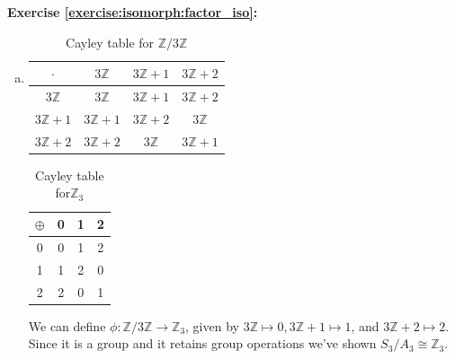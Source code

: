 \noindent\textbf{Exercise \ref{exercise:isomorph:factor_iso}:}
\begin{enumerate}[(a)]
\item
\begin{multicols}{2}
\begin{table}[H]
\caption{Cayley table for ${\mathbb Z}/ 3 {\mathbb Z}$}
{\small
\begin{center}
\begin{tabular}{c|ccc}
$\cdot$ & $ 3 {\mathbb Z}$ & $ 3 {\mathbb Z} + 1$ & $ 3 {\mathbb Z} + 2$ \\
\hline
$ 3 {\mathbb Z}$ & $ 3 {\mathbb Z}$ & $ 3 {\mathbb Z} + 1$ & $ 3 {\mathbb Z} + 2 $  \\
$ 3 {\mathbb Z} + 1$  & $ 3 {\mathbb Z} + 1$  & $ 3 {\mathbb Z} + 2$ &  $3 {\mathbb Z}$   \\
$ 3 {\mathbb Z} + 2$  & $ 3 {\mathbb Z} + 2$ & $ 3 {\mathbb Z}$ & $ 3 {\mathbb Z} + 1$ \\
\end{tabular}
\end{center}
}
\end{table}

\begin{table}[H]
\caption{Cayley table for${\mathbb Z}_3$}
{\small
\begin{center}
\begin{tabular}{c|ccc}
$\oplus$ & 0 & 1  & 2\\

\hline
0 & 0 & 1  & 2\\ 
1& 1 & 2 & 0\\
2 & 2 & 0 & 1\\
\end{tabular}
\end{center}
}
\end{table}
\end{multicols}
We can define $\phi:{\mathbb Z}/ 3 {\mathbb Z} \rightarrow {\mathbb Z}_3$,  given by  $3 {\mathbb Z} \mapsto 0,  3 {\mathbb Z} + 1 \mapsto 1$, and $3 {\mathbb Z} + 2 \mapsto 2$. Since it is a group and it retains group operations we've shown $S_3/A_3 \cong {\mathbb Z}_3$.

\end{enumerate}

